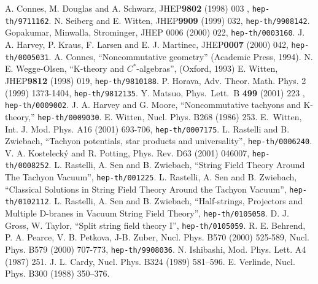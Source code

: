 \documentclass[a4paper,12pt]{article}
\begin{document}
\begin{thebibliography}{99}
 A. Connes, M. Douglas and A. Schwarz,
JHEP{\bf 9802} (1998) 003
, {\tt hep-th/9711162}.
 N. Seiberg and E. Witten,
JHEP{\bf 9909} (1999) 032, {\tt hep-th/9908142}.
 Gopakumar, Minwalla, Strominger,
JHEP 0006 (2000) 022, {\tt hep-th/0003160}.
 J. A. Harvey, P. Kraus, F. Larsen and E. J. Martinec,
JHEP{\bf 0007}
(2000) 042, {\tt hep-th/0005031}.
 A. Connes, ``Noncommutative geometry'' 
(Academic Press, 1994).
 N. E. Wegge-Olsen, ``K-theory and $C^*$-algebras'',
(Oxford, 1993)
 E. Witten, %
JHEP{\bf 9812} (1998) 019, {\tt hep-th/9810188}.
 P. Horava, Adv. Theor. Math. Phys. 2 
(1999) 1373-1404, {\tt hep-th/9812135}.
 Y. Matsuo, 
Phys.\ Lett.\ B {\bf 499} (2001) 223
, {\tt hep-th/0009002}.
 J. A. Harvey and G. Moore,
``Noncommutative tachyons and K-theory,''
{\tt hep-th/0009030}.
 E. Witten, 
Nucl. Phys. B268 (1986) 253.
 E.~Witten,
Int. J. Mod. Phys. A16 (2001) 693-706,
{\tt hep-th/0007175}.
 L. Rastelli and B. Zwiebach, ``Tachyon
potentials, star products and universality'', {\tt hep-th/0006240}.
 V. A. Kosteleck\'y and R. Potting,
Phys. Rev. D63 (2001) 046007,
{\tt hep-th/0008252}.
 L. Rastelli, A. Sen and B. Zwiebach,
``String Field Theory Around The Tachyon Vacuum'',
{\tt hep-th/001225}.
 L. Rastelli, A. Sen and B. Zwiebach,
``Classical Solutions in String Field Theory Around
the Tachyon Vacuum'', {\tt hep-th/0102112}.
 L. Rastelli, A. Sen and B. Zwiebach,
``Half-strings, Projectors and Multiple D-branes in Vacuum String
Field Theory'', {\tt hep-th/0105058}.
 D. J. Gross, W. Taylor,
``Split string field theory I'', {\tt hep-th/0105059}.
 R. E. Behrend, P. A. Pearce, V. B. Petkova,
J-B. Zuber, 
Nucl. Phys. B570 (2000) 525-589, Nucl. Phys. B579 (2000) 707-773,
{\tt hep-th/9908036}.
 N. Ishibashi, Mod. Phys. Lett. A4 (1987) 251.
 J. L. Cardy, Nucl. Phys. B324 (1989) 581--596.
 E. Verlinde, Nucl. Phys. B300 (1988) 350--376.

\end{thebibliography}
\end{document}
